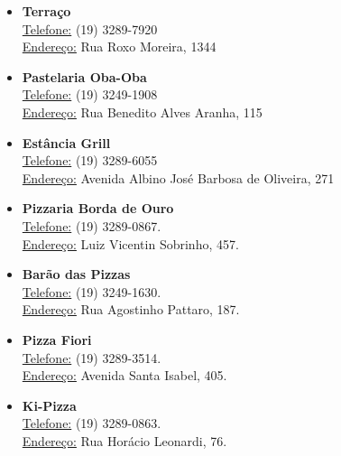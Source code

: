 \begin{itemize}
\item  \textbf{Terraço}
\\\underline{Telefone:} (19) 3289-7920
\\\underline{Endereço:} Rua Roxo Moreira, 1344
\end{itemize}

\begin{itemize}
\item  \textbf{Pastelaria Oba-Oba}
\\\underline{Telefone:} (19) 3249-1908
\\\underline{Endereço:} Rua Benedito Alves Aranha, 115
\end{itemize}

\begin{itemize}
\item  \textbf{Estância Grill}
\\\underline{Telefone:} (19) 3289-6055
\\\underline{Endereço:} Avenida Albino José Barbosa de Oliveira, 271
\end{itemize}

\begin{itemize}
\item  \textbf{Pizzaria Borda de Ouro}
\\\underline{Telefone:} (19) 3289-0867.
\\\underline{Endereço:} Luiz Vicentin Sobrinho, 457.
\end{itemize}

\begin{itemize}
\item  \textbf{Barão das Pizzas}
\\\underline{Telefone:} (19) 3249-1630.
\\\underline{Endereço:} Rua Agostinho Pattaro, 187.
\end{itemize}

\begin{itemize}
\item  \textbf{Pizza Fiori}
\\\underline{Telefone:} (19) 3289-3514.
\\\underline{Endereço:} Avenida Santa Isabel, 405.
\end{itemize}

\begin{itemize}
\item  \textbf{Ki-Pizza}
\\\underline{Telefone:} (19) 3289-0863.
\\\underline{Endereço:} Rua Horácio Leonardi, 76.
\end{itemize}


